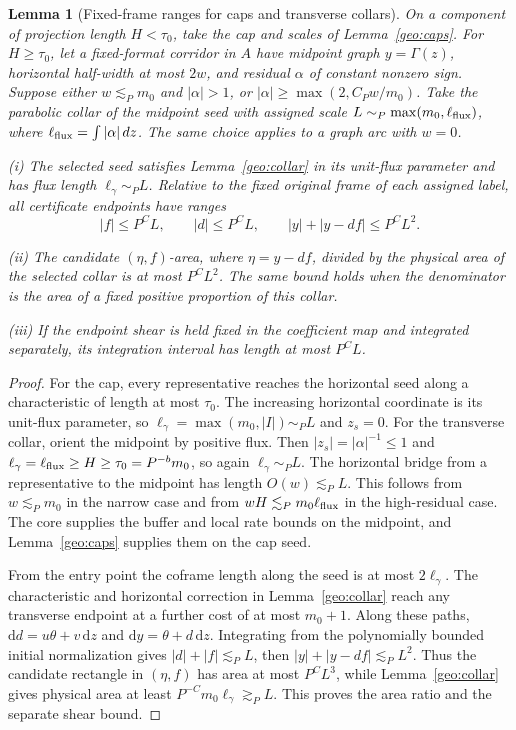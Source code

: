 \documentclass[11pt]{amsart}
\newtheorem{lemma}[theorem]{Lemma}
\theoremstyle{definition}
\theoremstyle{remark}
\numberwithin{equation}{section}
\begin{document}
\begin{lemma}[Fixed-frame ranges for caps and transverse collars]\label{geo:collar-endpoints}
On a component of projection length $H<\tau_0$, take the cap and scales of Lemma~\ref{geo:caps}. For $H\ge\tau_0$, let a fixed-format corridor in $A$ have midpoint graph $y=\Gamma(z)$, horizontal half-width at most $2w$, and residual $\alpha$ of constant nonzero sign. Suppose either $w\lesssim_Pm_0$ and $|\alpha|>1$, or $|\alpha|\ge\max(2,C_Pw/m_0)$. Take the parabolic collar of the midpoint seed with assigned scale $L\sim_P\max(m_0,\ell_{\rm flux})$, where $\ell_{\rm flux}=\int|\alpha|\,dz$. The same choice applies to a graph arc with $w=0$.

\noindent\textup{(i)} The selected seed satisfies Lemma~\ref{geo:collar} in its unit-flux parameter and has flux length $\ell_\gamma\sim_P L$. Relative to the fixed original frame of each assigned label, all certificate endpoints have ranges
\begin{equation}\label{geo:collar-ranges}
|f|\le P^CL,\qquad |d|\le P^CL,\qquad |y|+|y-df|\le P^CL^2.
\end{equation}

\noindent\textup{(ii)} The candidate $(\eta,f)$-area, where $\eta=y-df$, divided by the physical area of the selected collar is at most $P^CL^2$. The same bound holds when the denominator is the area of a fixed positive proportion of this collar.

\noindent\textup{(iii)} If the endpoint shear is held fixed in the coefficient map and integrated separately, its integration interval has length at most $P^CL$.
\end{lemma}
\begin{proof}
For the cap, every representative reaches the horizontal seed along a characteristic of length at most $\tau_0$. The increasing horizontal coordinate is its unit-flux parameter, so $\ell_\gamma=\max(m_0,|I|)\sim_P L$ and $z_s=0$. For the transverse collar, orient the midpoint by positive flux. Then $|z_s|=|\alpha|^{-1}\le1$ and $\ell_\gamma=\ell_{\rm flux}\ge H\ge\tau_0=P^{-b}m_0$, so again $\ell_\gamma\sim_P L$. The horizontal bridge from a representative to the midpoint has length $O(w)\lesssim_P L$. This follows from $w\lesssim_Pm_0$ in the narrow case and from $wH\lesssim_Pm_0\ell_{\rm flux}$ in the high-residual case. The core supplies the buffer and local rate bounds on the midpoint, and Lemma~\ref{geo:caps} supplies them on the cap seed.

From the entry point the coframe length along the seed is at most $2\ell_\gamma$. The characteristic and horizontal correction in Lemma~\ref{geo:collar} reach any transverse endpoint at a further cost of at most $m_0+1$. Along these paths, $\mathrm{d}d=u\theta+v\,\mathrm{d}z$ and $\mathrm{d}y=\theta+d\,\mathrm{d}z$. Integrating from the polynomially bounded initial normalization gives $|d|+|f|\lesssim_P L$, then $|y|+|y-df|\lesssim_P L^2$. Thus the candidate rectangle in $(\eta,f)$ has area at most $P^CL^3$, while Lemma~\ref{geo:collar} gives physical area at least $P^{-C}m_0\ell_\gamma\gtrsim_P L$. This proves the area ratio and the separate shear bound.
\end{proof}
\end{document}
